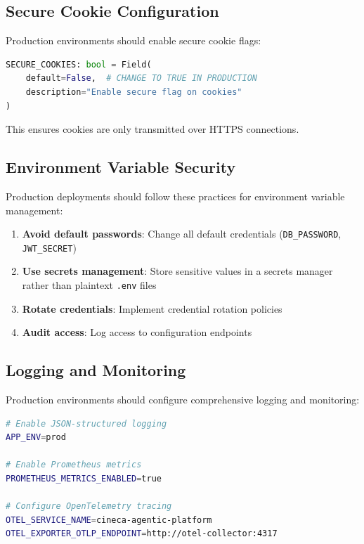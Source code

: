 \subsection{Secure Cookie Configuration}

Production environments should enable secure cookie flags:

\begin{lstlisting}[language=Python, caption=Secure cookie configuration]
SECURE_COOKIES: bool = Field(
    default=False,  # CHANGE TO TRUE IN PRODUCTION
    description="Enable secure flag on cookies"
)
\end{lstlisting}

This ensures cookies are only transmitted over HTTPS connections.

\subsection{Environment Variable Security}

Production deployments should follow these practices for environment variable management:

\begin{enumerate}
    \item \textbf{Avoid default passwords}: Change all default credentials (\texttt{DB\_PASSWORD}, \texttt{JWT\_SECRET})
    \item \textbf{Use secrets management}: Store sensitive values in a secrets manager rather than plaintext \texttt{.env} files
    \item \textbf{Rotate credentials}: Implement credential rotation policies
    \item \textbf{Audit access}: Log access to configuration endpoints
\end{enumerate}

\subsection{Logging and Monitoring}

Production environments should configure comprehensive logging and monitoring:

\begin{lstlisting}[language=bash, caption=Production logging configuration]
# Enable JSON-structured logging
APP_ENV=prod

# Enable Prometheus metrics
PROMETHEUS_METRICS_ENABLED=true

# Configure OpenTelemetry tracing
OTEL_SERVICE_NAME=cineca-agentic-platform
OTEL_EXPORTER_OTLP_ENDPOINT=http://otel-collector:4317
\end{lstlisting}

